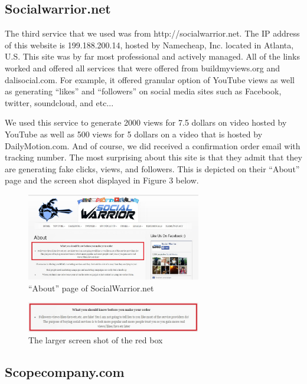 \documentclass[conference]{IEEEtran}
\begin{document}
\subsection{Socialwarrior.net}

The third service that we used was from http://socialwarrior.net. The IP address of this website is 199.188.200.14, hosted by Namecheap, Inc. located in Atlanta, U.S. This site was by far most professional and actively managed. All of the links worked and offered all services that were offered from buildmyviews.org and dalisocial.com. For example, it offered granular option of YouTube views as well as generating “likes” and “followers” on social media sites such as Facebook, twitter, soundcloud, and etc...

We used this service to generate 2000 views for 7.5 dollars on video hosted by YouTube as well as 500 views for 5 dollars on a video that is hosted by DailyMotion.com. And of course, we did received a confirmation order email with tracking number. The most surprising about this site is that they admit that they are generating fake clicks, views, and followers. This is depicted on their ``About'' page and the screen shot displayed in Figure 3 below.

\begin{figure}
  \centering
  \includegraphics[width=3.0in]{fig3a}
  \caption{``About'' page of SocialWarrior.net}
\end{figure}

\begin{figure}
  \centering
  \includegraphics[width=3.0in]{fig3b}
  \caption{The larger screen shot of the red box}
\end{figure}

\subsection{Scopecompany.com}
\end{document}
